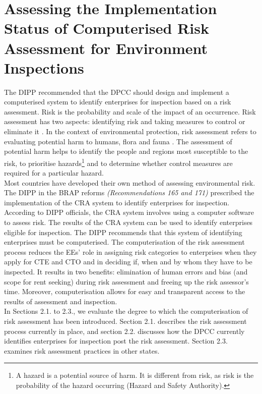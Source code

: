 \documentclass[a4paper, 12pt]{article}
\begin{document}
                 \section{Assessing the Implementation Status of Computerised Risk Assessment for Environment Inspections}\label{sec:1} 
                 
                 The DIPP recommended that the DPCC should design and implement a computerised system to identify enterprises for inspection based on a risk assessment. Risk is the probability and scale of the impact of an occurrence. Risk assessment has two aspects: identifying risk and taking measures to control or eliminate it \parencite{Stoneburner}. In the context of environmental protection, risk assessment refers to evaluating potential harm to humans, flora and fauna \parencite{EPAnd}. The assessment of potential harm helps to identify the people and regions most susceptible to the risk, to prioritise hazards\footnote{A hazard is a potential source of harm. It is different from risk, as risk is the probability of the hazard occurring (Hazard and Safety Authority).} and to determine whether control measures are required for a particular hazard. \\
                 
                 Most countries have developed their own method of assessing environmental risk. The DIPP in the BRAP reforms \textit{(Recommendations 165 and 171)} prescribed the implementation of the CRA system to identify enterprises for inspection. \\ 
                 
                 According to DIPP officials, the CRA system involves using a computer software to assess risk. The results of the CRA system can be used to identify enterprises eligible for inspection. The DIPP recommends that this system of identifying enterprises must be computerised. The computerisation of the risk assessment process reduces the EEs’ role in assigning risk categories to enterprises when they apply for CTE and CTO and in deciding if, when and by whom they have to be inspected. It results in two benefits: elimination of human errors and bias (and scope for rent seeking) during  risk assessment and freeing up the risk assessor’s time. Moreover, computerisation allows for easy and transparent access to the results of assessment and inspection. \\
                 
                 In Sections 2.1. to 2.3., we evaluate the degree to which the computerisation of risk assessment has been introduced. Section 2.1. describes the risk assessment process currently in place, and section 2.2. discusses how the DPCC currently identifies enterprises for inspection post the risk assessment. Section 2.3. examines risk assessment practices in other states. 
                                  
\end{document}
